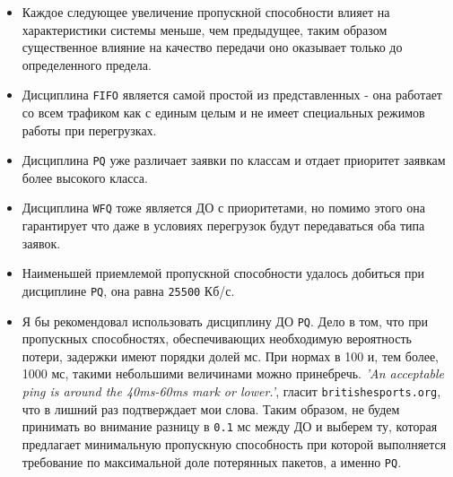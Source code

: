 \documentclass[12pt, a4paper]{article}
\begin{document}
\begin{itemize}
  \item Каждое следующее увеличение пропускной способности влияет на характеристики
    системы меньше, чем предыдущее, таким образом существенное влияние на качество
    передачи оно оказывает только до определенного предела.
  \item Дисциплина \texttt{FIFO} является самой простой из
    представленных - она работает со всем трафиком как с единым целым и не имеет
    специальных режимов работы при перегрузках.
  \item Дисциплина \texttt{PQ} уже различает заявки по классам и отдает приоритет
    заявкам более высокого класса.
  \item Дисциплина \texttt{WFQ} тоже является ДО с приоритетами, но помимо этого
    она гарантирует что даже в условиях перегрузок будут передаваться оба типа
    заявок.
  \item Наименьшей приемлемой пропускной способности удалось добиться при дисциплине
    \texttt{PQ}, она равна \texttt{25500} Кб/с.
  \item Я бы рекомендовал использовать дисциплину ДО \texttt{PQ}. Дело в том, что
    при пропускных способностях, обеспечивающих необходимую вероятность потери,
    задержки имеют порядки долей мс. При нормах в 100 и, тем более, 1000 мс, такими
    небольшими величинами можно принебречь.
    \textit{'An acceptable ping is around the 40ms-60ms mark or lower.'}, гласит \texttt{britishesports.org},
    что в лишний раз подтверждает мои слова. Таким образом, не будем принимать во
    внимание разницу в \texttt{0.1} мс между ДО и выберем ту, которая предлагает
    минимальную пропускную способность при которой выполняется требование по
    максимальной доле потерянных пакетов, а именно \texttt{PQ}.
\end{itemize}
\end{document}
